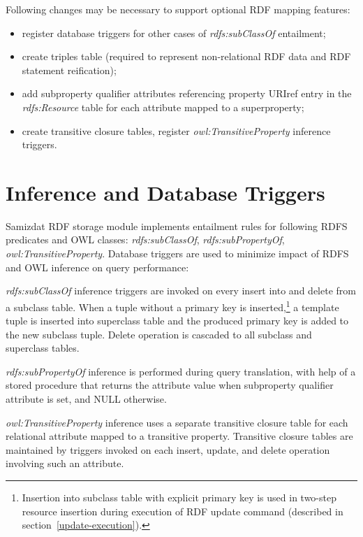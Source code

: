 \documentclass[conference,letterpaper]{IEEEtran}
\begin{document}
Following changes may be necessary to support optional RDF mapping
features:

\begin{itemize}

\item register database triggers for other cases of {\em
rdfs:sub\-Class\-Of\/} entailment;

\item create triples table (required to represent non-relational RDF
data and RDF statement reification);

\item add subproperty qualifier attributes referencing property URIref
entry in the {\em rdfs:Resource\/} table for each attribute mapped to a
superproperty;

\item create transitive closure tables, register {\em
owl:TransitivePro\-perty\/} inference triggers.

\end{itemize}


\section{Inference and Database Triggers}
\label{inference-triggers}

Samizdat RDF storage module implements entailment rules for following
RDFS predicates and OWL classes: {\em rdfs:sub\-Class\-Of}, {\em
rdfs:sub\-Property\-Of}, {\em owl:Transitive\-Property}. Database
triggers are used to minimize impact of RDFS and OWL inference on query
performance:

{\em rdfs:subClassOf\/} inference triggers are invoked on every insert
into and delete from a subclass table. When a tuple without a primary
key is inserted,\footnote{Insertion into subclass table with explicit
primary key is used in two-step resource insertion during execution of
RDF update command (described in section~\ref{update-execution}).} a
template tuple is inserted into superclass table and the produced
primary key is added to the new subclass tuple. Delete operation is
cascaded to all subclass and superclass tables.

{\em rdfs:subPropertyOf\/} inference is performed during query
translation, with help of a stored procedure that returns the attribute
value when subproperty qualifier attribute is set, and NULL otherwise.

{\em owl:TransitiveProperty\/} inference uses a separate transitive
closure table for each relational attribute mapped to a transitive
property. Transitive closure tables are maintained by triggers invoked
on each insert, update, and delete operation involving such an
attribute.
\end{document}
